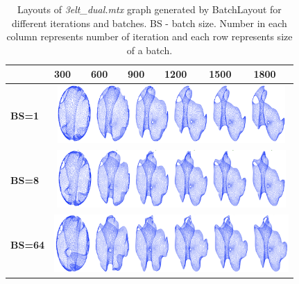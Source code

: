 \documentclass[conference]{article}
\begin{document}
\begin{table}[!htp]
\centering
\caption{Layouts of \emph{3elt\_dual.mtx} graph generated by BatchLayout for different iterations and batches. BS - batch size. Number in each column represents number of iteration and each row represents size of a batch.}
\label{tab:gridlayout}

\begin{tabular}{|p{1.7cm}|p{1.3cm}|p{1.3cm}|p{1.3cm}|p{1.3cm}|p{1.3cm}|p{1.3cm}|}
\hline
\textbf{}   & \textbf{300} & \textbf{600} & \textbf{900} & \textbf{1200} & \textbf{1500} & \textbf{1800} \\ \hline
        \textbf{BS=1} & \multicolumn{6}{|c|}{\includegraphics[height=2.2cm,width=0.8\linewidth]{layouts/batches/batch1.png}}                                                                                                                \\ \hline

    \textbf{BS=8} & \multicolumn{6}{|c|}{\includegraphics[height=2.2cm,width=0.8\linewidth]{layouts/batches/batch8.png}}                                                                                                                \\ \hline
    
            \textbf{BS=64} & \multicolumn{6}{|c|}{\includegraphics[height=2.2cm,width=0.8\linewidth]{layouts/batches/batch64.png}}                            \\ \hline
            

\end{tabular}
\end{table}
\end{document}
